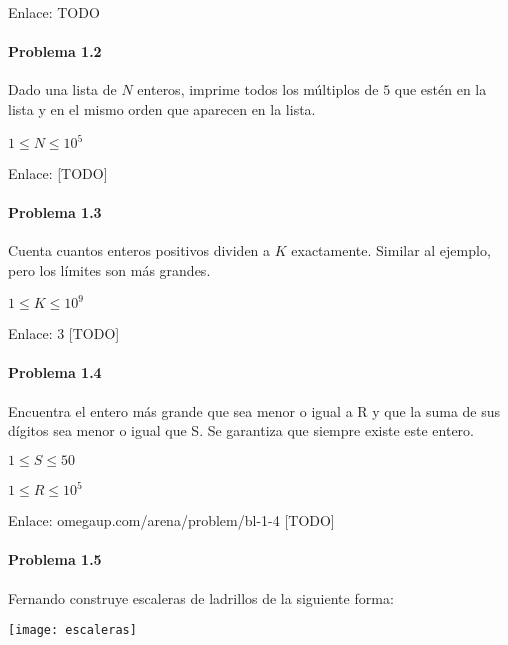Enlace: TODO

\problembreak

\paragraph{Problema 1.2} Dado una lista de \(N\) enteros, imprime todos los múltiplos de \(5\) que estén en la lista y en el mismo orden que aparecen en la lista. 

\begin{plimits}
	\item \(1\leq N \leq 10^5\)
\end{plimits}

Enlace: [TODO]

\problembreak

\paragraph{Problema 1.3} Cuenta cuantos enteros positivos dividen a \(K\) exactamente. Similar al ejemplo, pero los límites son más grandes.
\begin{plimits}	
\item \(1\leq K \leq 10^9\)
\end{plimits}

Enlace: 3 [TODO]

\problembreak

\paragraph{Problema 1.4} Encuentra el entero más grande que sea menor o igual a R y que la suma de sus dígitos sea menor o igual que S. Se garantiza que siempre existe este entero.
\begin{plimits}
\item \(1\leq S\leq 50\)
\item \(1\leq R\leq10^5\)
\end{plimits}

Enlace: omegaup.com/arena/problem/bl-1-4 [TODO]

\problembreak

\paragraph{Problema 1.5} Fernando construye escaleras de ladrillos de la siguiente forma:
\begin{center}
\texttt{[image: escaleras]}
\end{center}

